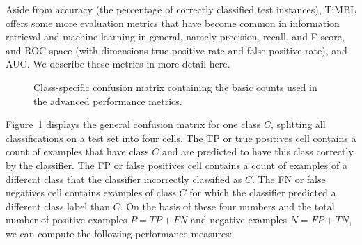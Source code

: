\documentclass{report}
\begin{document}
Aside from accuracy (the percentage of correctly classified test
instances), TiMBL offers some more evaluation metrics that have become
common in information retrieval and machine learning in general,
namely precision, recall, and F-score, and ROC-space (with dimensions
true positive rate and false positive rate), and AUC. We describe
these metrics in more detail here.

\begin{figure}
\begin{center}
\vspace*{-0.5cm}
\end{center}
\caption{Class-specific confusion matrix containing the basic counts
  used in the advanced performance metrics. \label{confmat}}
\end{figure}

Figure~\ref{confmat} displays the general confusion
matrix for one class $C$, splitting all
classifications on a test set into four cells. The TP or true
positives cell contains a count of examples that have class $C$ and
are predicted to have this class correctly by the classifier. The FP
or false positives cell contains a count of examples of a different
class that the classifier incorrectly classified as $C$. The FN or
false negatives cell contains examples of class $C$ for which the
classifier predicted a different class label than $C$.  On the basis
of these four numbers and the total number of positive examples
$P=TP+FN$ and negative examples $N=FP+TN$, we can compute the
following performance measures:
\end{document}
